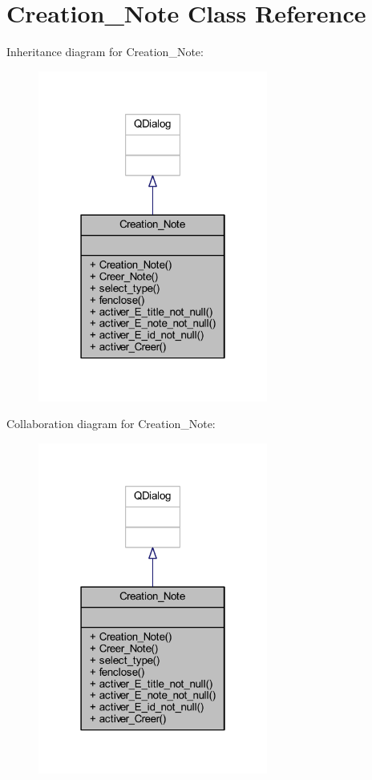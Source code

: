 \hypertarget{class_creation___note}{}\section{Creation\+\_\+\+Note Class Reference}
\label{class_creation___note}


Inheritance diagram for Creation\+\_\+\+Note\+:
\nopagebreak
\begin{figure}[H]
\begin{center}
\leavevmode
\includegraphics[width=214pt]{class_creation___note__inherit__graph}
\end{center}
\end{figure}


Collaboration diagram for Creation\+\_\+\+Note\+:
\nopagebreak
\begin{figure}[H]
\begin{center}
\leavevmode
\includegraphics[width=214pt]{class_creation___note__coll__graph}
\end{center}
\end{figure}

